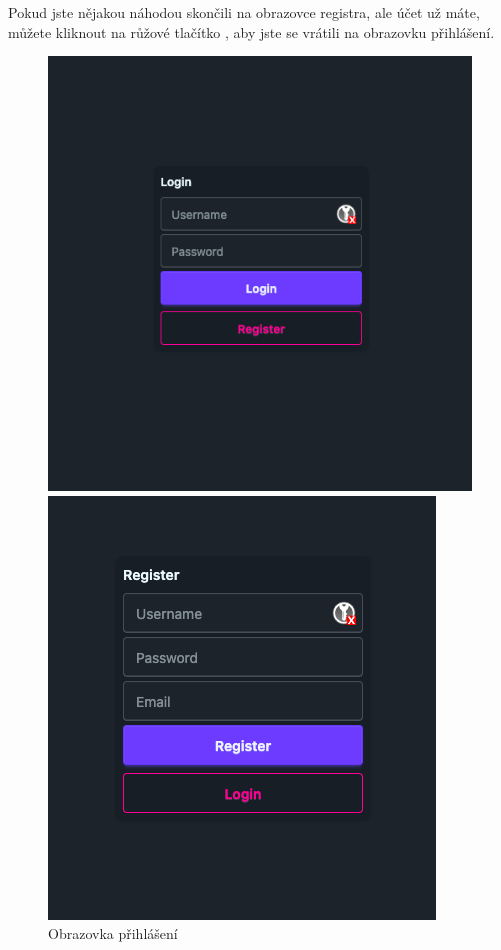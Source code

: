 Pokud jste nějakou náhodou skončili na obrazovce registra, ale účet už máte,
můžete kliknout na růžové tlačítko , aby jste se vrátili na obrazovku
přihlášení.
\begin{figure}[h]
    \begin{minipage}[t]{0.45\textwidth}
        \begin{center}
            \includegraphics[width=0.9\linewidth]{graphics/login_screen.png}
            \caption{Obrazovka přihlášení}
            \label{fig:loginscreen}
        \end{center}
    \end{minipage}
    \hfill
    \begin{minipage}[t]{0.45\textwidth}
        \begin{center}
            \includegraphics[width=0.9\linewidth]{graphics/register_screen.png}

\end{center}
\end{minipage}
\end{figure}
